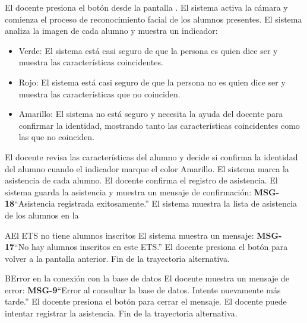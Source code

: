 \begin{UCtrayectoria}
	\UCpaso[\UCactor] El docente presiona el botón  desde la pantalla .
	\UCpaso El sistema activa la cámara y comienza el proceso de reconocimiento facial de los alumnos presentes.  
	\UCpaso El sistema analiza la imagen de cada alumno y muestra un indicador:
	\begin{itemize}
		\item Verde: El sistema está casi seguro de que la persona es quien dice ser y muestra las características coincidentes.
		\item Rojo: El sistema está casi seguro de que la persona no es quien dice ser y muestra las características que no coinciden. 
		\item Amarillo: El sistema no está seguro y necesita la ayuda del docente para confirmar la identidad, mostrando tanto las características coincidentes como las que no coinciden. 
	\end{itemize}
	\UCpaso[\UCactor] El docente revisa las características del alumno y decide si confirma la identidad del alumno cuando el indicador marque el color Amarillo. 
	\UCpaso El sistema marca la asistencia de cada alumno.
	\UCpaso[\UCactor] El docente confirma el registro de asistencia.
	\UCpaso El sistema guarda la asistencia y muestra un mensaje de confirmación: {\bf MSG-18}{``Asistencia registrada exitosamente.''}
	\UCpaso El sistema muestra la lista de asistencia de los alumnos en la 
\end{UCtrayectoria}
\begin{UCtrayectoriaA}{A}{El ETS no tiene alumnos inscritos}
	\UCpaso El sistema muestra un mensaje: {\bf MSG-17}{``No hay alumnos inscritos en este ETS.''}
	\UCpaso[\UCactor] El docente presiona el botón  para volver a la pantalla anterior.
	\UCpaso Fin de la trayectoria alternativa.
\end{UCtrayectoriaA}
\begin{UCtrayectoriaA}{B}{Error en la conexión con la base de datos}
	\UCpaso[\UCactor] El docente muestra un mensaje de error: {\bf MSG-9}{``Error al consultar la base de datos. Intente nuevamente más tarde.''}
	\UCpaso[\UCactor] El docente presiona el botón  para cerrar el mensaje.
	\UCpaso[\UCactor] El docente puede intentar registrar la asistencia.
	\UCpaso Fin de la trayectoria alternativa.
\end{UCtrayectoriaA}

